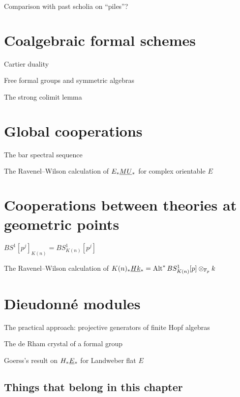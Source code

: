 Comparison with past scholia on ``piles''?






\section{Coalgebraic formal schemes}

Cartier duality

Free formal groups and symmetric algebras

The strong colimit lemma






\section{Global cooperations}

The bar spectral sequence

The Ravenel--Wilson calculation of $E_* \smash{\underline{MU}}_{*}$ for complex orientable $E$





\section{Cooperations between theories at geometric points}

$BS^1[p^j]_{K(n)} = BS^1_{K(n)}[p^j]$

The Ravenel--Wilson calculation of $K(n)_* \smash{\underline{Hk}}_{*} = \operatorname{Alt}^* BS^1_{K(n)}[p] \otimes_{\mathbb F_p} k$



\section{Dieudonn\'e modules}

The practical approach: projective generators of finite Hopf algebras

The de Rham crystal of a formal group

Goerss's result on $H_* \smash{\underline{E}}_{*}$ for Landweber flat $E$





\subsection*{Things that belong in this chapter}

